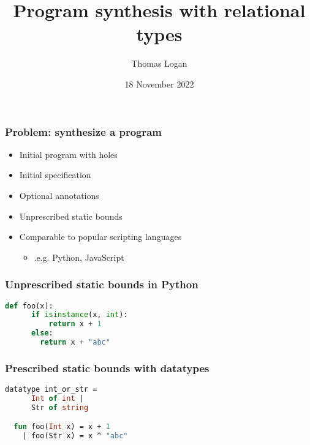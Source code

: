 \documentclass{beamer}
\title{Program synthesis with relational types}
\author{Thomas Logan}
\date{18 November 2022}
\begin{document}
\begin{frame}
  \titlepage
\end{frame}

\begin{frame}
  \frametitle{Problem: synthesize a program}

  \begin{itemize}
  \item Initial program with holes 
  \item Initial specification  
  \item Optional annotations  
  \item Unprescribed static bounds
  \item Comparable to popular scripting languages
    \begin{itemize}
    \item .e.g. Python, JavaScript  
    \end{itemize}
  \end{itemize}
\end{frame}

\begin{frame}[fragile]
  \frametitle{Unprescribed static bounds in Python}

  \begin{lstlisting}[language=Python]
  def foo(x):
      if isinstance(x, int):
          return x + 1 
      else:
        return x + "abc"
  \end{lstlisting}
\end{frame}

\begin{frame}[fragile]
  \frametitle{Prescribed static bounds with datatypes}

  \begin{lstlisting}[language=ML]
  datatype int_or_str = 
      Int of int | 
      Str of string

  fun foo(Int x) = x + 1
    | foo(Str x) = x ^ "abc"
  \end{lstlisting}

\end{frame}
\end{document}
